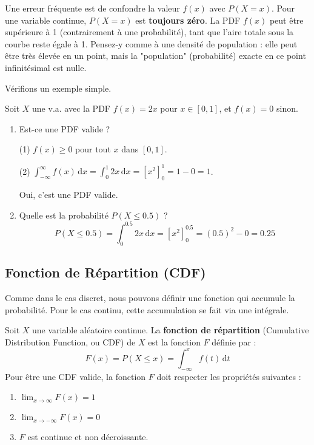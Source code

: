 \begin{remarquebox}
Une erreur fréquente est de confondre la valeur $f(x)$ avec $P(X=x)$. Pour une variable continue, $P(X=x)$ est \textbf{toujours zéro}. La PDF $f(x)$ peut être supérieure à 1 (contrairement à une probabilité), tant que l'aire totale sous la courbe reste égale à 1. Pensez-y comme à une densité de population : elle peut être très élevée en un point, mais la "population" (probabilité) exacte en ce point infinitésimal est nulle.
\end{remarquebox}

Vérifions un exemple simple.

\begin{examplebox}
Soit $X$ une v.a. avec la PDF $f(x) = 2x$ pour $x \in [0, 1]$, et $f(x)=0$ sinon.
\begin{enumerate}
    \item Est-ce une PDF valide ?
    
    (1) $f(x) \ge 0$ pour tout $x$ dans $[0, 1]$.
    
    (2) $\int_{-\infty}^{\infty} f(x) \, \mathrm{d}x = \int_0^1 2x \, \mathrm{d}x = [x^2]_0^1 = 1-0 = 1$.
    
    Oui, c'est une PDF valide.
    \item Quelle est la probabilité $P(X \le 0.5)$ ?
    $$ P(X \le 0.5) = \int_0^{0.5} 2x \, \mathrm{d}x = [x^2]_0^{0.5} = (0.5)^2 - 0 = 0.25 $$
\end{enumerate}
\end{examplebox}

\subsection{Fonction de Répartition (CDF)}

Comme dans le cas discret, nous pouvons définir une fonction qui accumule la probabilité. Pour le cas continu, cette accumulation se fait via une intégrale.

\begin{definitionbox}
Soit $X$ une variable aléatoire continue. La \textbf{fonction de répartition} (Cumulative Distribution Function, ou CDF) de $X$ est la fonction $F$ définie par :
$$ F(x) = P(X \le x) = \int_{-\infty}^x f(t) \, \mathrm{d}t $$
Pour être une CDF valide, la fonction $F$ doit respecter les propriétés suivantes :
\begin{enumerate}
    \item $\lim_{x \to \infty} F(x) = 1$
    \item $\lim_{x \to -\infty} F(x) = 0$
    \item $F$ est continue et non décroissante.
\end{enumerate}
\end{definitionbox}

